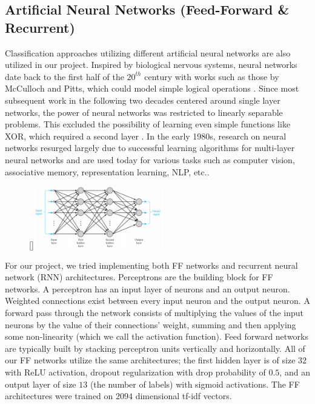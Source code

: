 \documentclass[11pt]{article}
\begin{document}
\subsection{Artificial Neural Networks (Feed-Forward \& Recurrent)}
Classification approaches utilizing different artificial neural networks are also utilized in our project. Inspired by biological nervous systems, neural networks date back to the first half of the $20^{th}$ century with works such as those by McCulloch and Pitts, which could model simple logical operations \autocite{Piccinini}. Since most subsequent work in the following two decades centered around single layer networks, the power of neural networks was restricted to linearly separable problems. This excluded the possibility of learning even simple functions like XOR, which required a second layer \autocite{NNLM}. In the early 1980s, research on neural networks resurged largely due to successful learning algorithms for multi-layer neural networks and are used today for various tasks such as computer vision, associative memory, representation learning, NLP, etc..

\begin{figure}
    \begin{center}
        \raisebox{0pt}[\dimexpr{}\baselineskip\relax]{\includegraphics[width=0.5\textwidth]{multilayer_network_Haykin.PNG}}
    \end{center}
\end{figure}

For our project, we tried implementing both FF networks and recurrent neural network (RNN) architectures. Perceptrons are the building block for FF networks. A perceptron has an input layer of neurons and an output neuron. Weighted connections exist between every input neuron and the output neuron. A forward pass through the network consists of multiplying the values of the input neurons by the value of their connections' weight, summing and then applying some non-linearity (which we call the activation function). Feed forward networks are typically built by stacking perceptron units vertically and horizontally. All of our FF networks utilize the same architectures; the first hidden layer is of size $32$ with ReLU activation, dropout regularization with drop probability of $0.5$, and an output layer of size $13$ (the number of labels) with sigmoid activations. The FF architectures were trained on $2094$ dimensional tf-idf vectors. 
\end{document}
